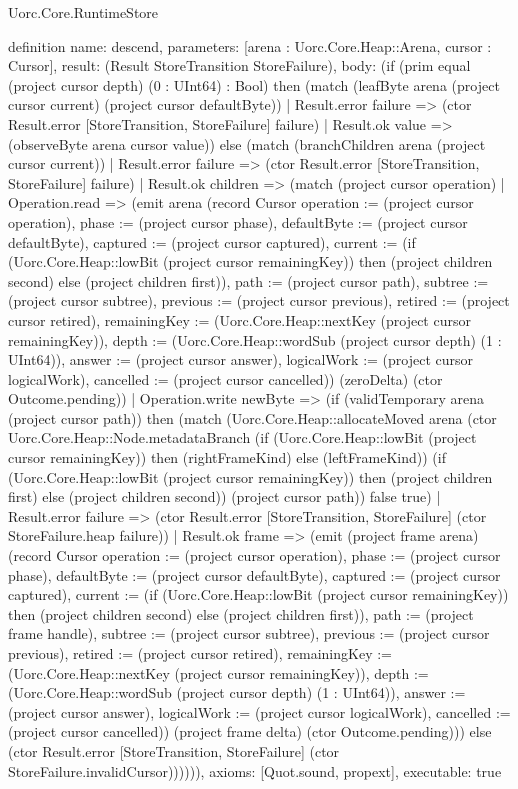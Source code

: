 \begin{lexlean}{Uorc.Core.RuntimeStore}
\begin{semanticmodule}
definition{
  name: descend,
  parameters: [arena : Uorc.Core.Heap::Arena, cursor : Cursor],
  result: (Result StoreTransition StoreFailure),
  body: (if (prim equal (project cursor depth) (0 : UInt64) : Bool) then (match (leafByte arena (project cursor current) (project cursor defaultByte))
    | Result.error failure => (ctor Result.error [StoreTransition, StoreFailure] failure)
    | Result.ok value => (observeByte arena cursor value)) else (match (branchChildren arena (project cursor current))
    | Result.error failure => (ctor Result.error [StoreTransition, StoreFailure] failure)
    | Result.ok children => (match (project cursor operation)
      | Operation.read => (emit arena (record Cursor {operation := (project cursor operation), phase := (project cursor phase), defaultByte := (project cursor defaultByte), captured := (project cursor captured), current := (if (Uorc.Core.Heap::lowBit (project cursor remainingKey)) then (project children second) else (project children first)), path := (project cursor path), subtree := (project cursor subtree), previous := (project cursor previous), retired := (project cursor retired), remainingKey := (Uorc.Core.Heap::nextKey (project cursor remainingKey)), depth := (Uorc.Core.Heap::wordSub (project cursor depth) (1 : UInt64)), answer := (project cursor answer), logicalWork := (project cursor logicalWork), cancelled := (project cursor cancelled)}) (zeroDelta) (ctor Outcome.pending))
      | Operation.write newByte => (if (validTemporary arena (project cursor path)) then (match (Uorc.Core.Heap::allocateMoved arena (ctor Uorc.Core.Heap::Node.metadataBranch (if (Uorc.Core.Heap::lowBit (project cursor remainingKey)) then (rightFrameKind) else (leftFrameKind)) (if (Uorc.Core.Heap::lowBit (project cursor remainingKey)) then (project children first) else (project children second)) (project cursor path)) false true)
        | Result.error failure => (ctor Result.error [StoreTransition, StoreFailure] (ctor StoreFailure.heap failure))
        | Result.ok frame => (emit (project frame arena) (record Cursor {operation := (project cursor operation), phase := (project cursor phase), defaultByte := (project cursor defaultByte), captured := (project cursor captured), current := (if (Uorc.Core.Heap::lowBit (project cursor remainingKey)) then (project children second) else (project children first)), path := (project frame handle), subtree := (project cursor subtree), previous := (project cursor previous), retired := (project cursor retired), remainingKey := (Uorc.Core.Heap::nextKey (project cursor remainingKey)), depth := (Uorc.Core.Heap::wordSub (project cursor depth) (1 : UInt64)), answer := (project cursor answer), logicalWork := (project cursor logicalWork), cancelled := (project cursor cancelled)}) (project frame delta) (ctor Outcome.pending))) else (ctor Result.error [StoreTransition, StoreFailure] (ctor StoreFailure.invalidCursor)))))),
  axioms: [Quot.sound, propext],
  executable: true
}


\end{semanticmodule}
\end{lexlean}
